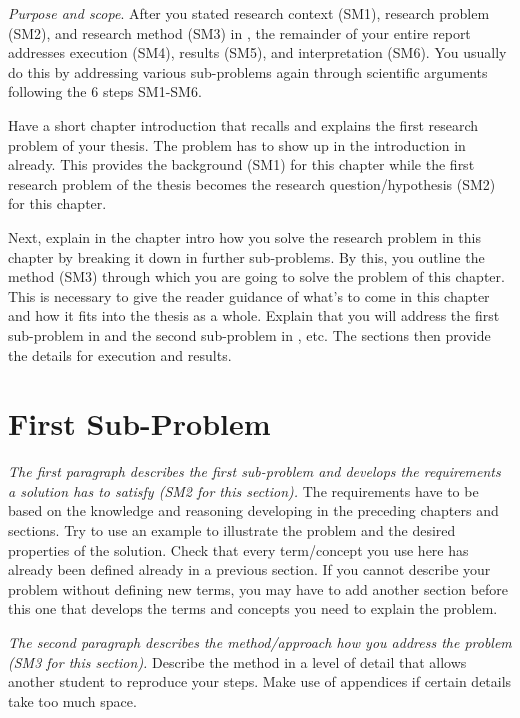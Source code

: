 \emph{Purpose and scope}.
After you stated research context (SM1), research problem (SM2), and research method (SM3) in , the remainder of your entire report addresses execution (SM4), results (SM5), and interpretation (SM6).
You usually do this by addressing various sub-problems again through scientific arguments following the 6 steps SM1-SM6.

Have a short chapter introduction that recalls and explains the first research problem of your thesis.
The problem has to show up in the introduction in  already.
This provides the background (SM1) for this chapter while the first research problem of the thesis becomes the research question/hypothesis (SM2) for this chapter.

Next, explain in the chapter intro how you solve the research problem in this chapter by breaking it down in further sub-problems.
By this, you outline the method (SM3) through which you are going to solve the problem of this chapter.
This is necessary to give the reader guidance of what's to come in this chapter and how it fits into the thesis as a whole.
Explain that you will address the first sub-problem in  and the second sub-problem in , etc. The sections then provide the details for execution and results.

\section{First Sub-Problem}\label{sec:problem1:subproblem1}

\emph{The first paragraph describes the first sub-problem and develops the requirements a solution has to satisfy (SM2 for this section).}
The requirements have to be based on the knowledge and reasoning developing in the preceding chapters and sections.
Try to use an example to illustrate the problem and the desired properties of the solution.
Check that every term/concept you use here has already been defined already in a previous section.
If you cannot describe your problem without defining new terms, you may have to add another section before this one that develops the terms and concepts you need to explain the problem.

\emph{The second paragraph describes the method/approach how you address the problem (SM3 for this section).}
Describe the method in a level of detail that allows another student to reproduce your steps.
Make use of appendices %
if certain details take too much space.

